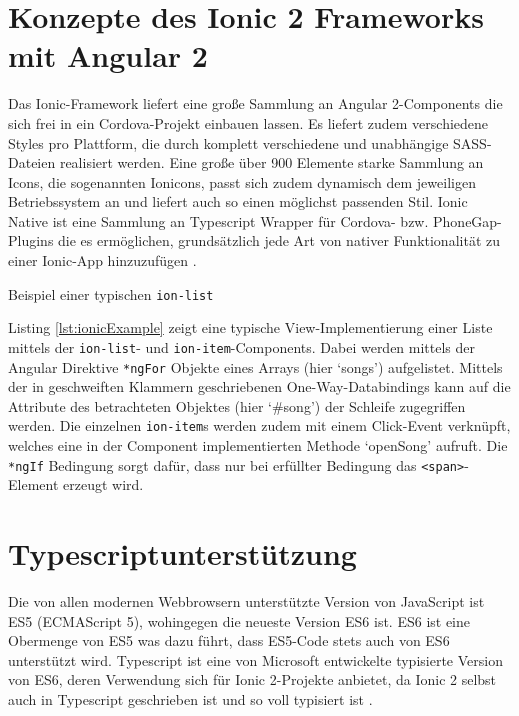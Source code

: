 \section{Konzepte des Ionic 2 Frameworks mit Angular 2}
\label{sec:ionicKonzepte}

Das Ionic-Framework liefert eine große Sammlung an Angular 2-Components die sich frei in ein Cordova-Projekt einbauen lassen. Es liefert zudem verschiedene Styles pro Plattform, die durch komplett verschiedene und unabhängige SASS-Dateien realisiert werden. Eine große über 900 Elemente starke Sammlung an Icons, die sogenannten Ionicons, passt sich zudem dynamisch dem jeweiligen Betriebssystem an und liefert auch so einen möglichst passenden Stil. Ionic Native ist eine Sammlung an Typescript Wrapper für Cordova- bzw. PhoneGap-Plugins die es ermöglichen, grundsätzlich jede Art von nativer Funktionalität zu einer Ionic-App hinzuzufügen \cite{ionic2Docu}.
% 
\begin{listing}
    
    \caption{Beispiel einer typischen \texttt{ion-list}}
    \label{lst:ionicExample}
\end{listing}

Listing \ref{lst:ionicExample} zeigt eine typische View-Implementierung einer Liste mittels der \texttt{ion-list}- und \texttt{ion-item}-Components. Dabei werden mittels der Angular Direktive \texttt{*ngFor} Objekte eines Arrays (hier `songs') aufgelistet. Mittels der in geschweiften Klammern geschriebenen One-Way-Databindings kann auf die Attribute des betrachteten Objektes (hier `\#song') der Schleife zugegriffen werden. Die einzelnen \texttt{ion-item}s werden zudem mit einem Click-Event verknüpft, welches eine in der Component implementierten Methode `openSong' aufruft. Die \texttt{*ngIf} Bedingung sorgt dafür, dass nur bei erfüllter Bedingung das \texttt{<span>}-Element erzeugt wird.
%
%
%
\section{Typescriptunterstützung}
%
Die von allen modernen Webbrowsern unterstützte Version von JavaScript ist ES5 (ECMAScript 5), wohingegen die neueste Version ES6 ist. ES6 ist eine Obermenge von ES5 was dazu führt, dass ES5-Code stets auch von ES6 unterstützt wird. Typescript ist eine von Microsoft entwickelte typisierte Version von ES6, deren Verwendung sich für Ionic 2-Projekte anbietet, da Ionic 2 selbst auch in Typescript geschrieben ist und so voll typisiert ist \cite{ionic2Docu}.

